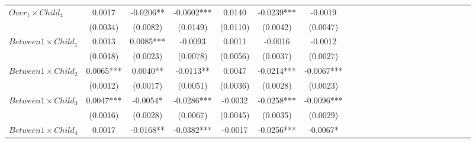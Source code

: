 \begin{subappendices}
{\begin{landscape}
\begin{table}[H]
{\begin{tabular}{lccccccccccccccccccccc}
$Over_{1} \times Child_4$                         & 0.0017                  &     -0.0206**              &   -0.0602***                   &  0.0140                      &                   -0.0239***     &       -0.0019                              \\
                                                  & (0.0034)                &     (0.0082)               &   (0.0149)                     &  (0.0110)                    &                   (0.0042)       &       (0.0047)                             \\
\midrule
$Between1 \times Child_1$                         & 0.0013                  &     0.0085***              &   -0.0093                      &  0.0011                      &                   -0.0016        &       -0.0012                              \\
                                                  & (0.0018)                &     (0.0023)               &   (0.0078)                     &  (0.0056)                    &                   (0.0037)       &       (0.0027)                             \\
$Between1 \times Child_2$                         & 0.0065***               &     0.0040**               &   -0.0113**                    &  0.0047                      &                   -0.0214***     &       -0.0067***                           \\
                                                  & (0.0012)                &     (0.0017)               &   (0.0051)                     &  (0.0036)                    &                   (0.0028)       &       (0.0023)                             \\
$Between1 \times Child_3$                         & 0.0047***               &     -0.0054*               &   -0.0286***                   &  -0.0032                     &                   -0.0258***     &       -0.0096***                           \\
                                                  & (0.0016)                &     (0.0028)               &   (0.0067)                     &  (0.0045)                    &                   (0.0035)       &       (0.0029)                             \\
$Between1 \times Child_4$                         & 0.0017                  &     -0.0168**              &   -0.0382***                   &  -0.0017                     &                   -0.0256***     &       -0.0067*                             \\

\end{tabular}}
\end{table}
\end{landscape}}
\end{subappendices}
